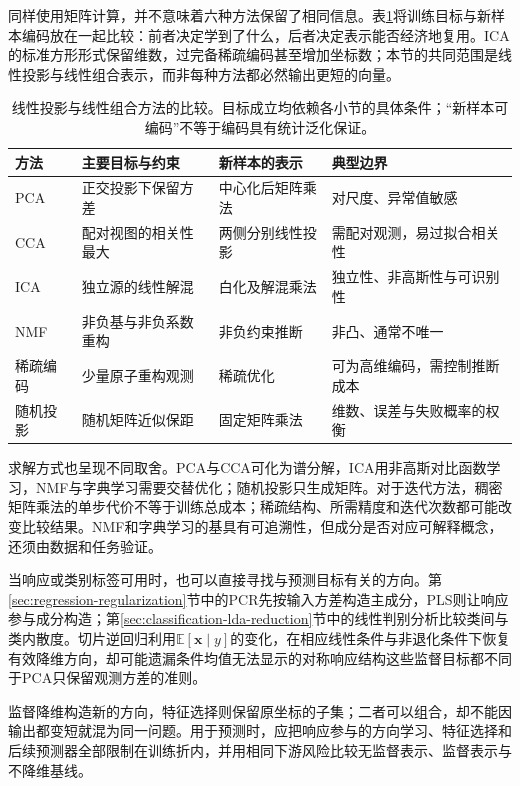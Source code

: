 同样使用矩阵计算，并不意味着六种方法保留了相同信息。表\ref{tab:dim-linear-comparison}将训练目标与新样本编码放在一起比较：前者决定学到了什么，后者决定表示能否经济地复用。ICA的标准方形形式保留维数，过完备稀疏编码甚至增加坐标数；本节的共同范围是线性投影与线性组合表示，而非每种方法都必然输出更短的向量。

\begin{table}[htbp]
  \centering
  \small
  \begin{tabularx}{\linewidth}{@{}lXXX@{}}
    \toprule
    方法 & 主要目标与约束 & 新样本的表示 & 典型边界\\
    \midrule
    PCA & 正交投影下保留方差 & 中心化后矩阵乘法 & 对尺度、异常值敏感\\
    CCA & 配对视图的相关性最大 & 两侧分别线性投影 & 需配对观测，易过拟合相关性\\
    ICA & 独立源的线性解混 & 白化及解混乘法 & 独立性、非高斯性与可识别性\\
    NMF & 非负基与非负系数重构 & 非负约束推断 & 非凸、通常不唯一\\
    稀疏编码 & 少量原子重构观测 & 稀疏优化 & 可为高维编码，需控制推断成本\\
    随机投影 & 随机矩阵近似保距 & 固定矩阵乘法 & 维数、误差与失败概率的权衡\\
    \bottomrule
  \end{tabularx}
  \caption{线性投影与线性组合方法的比较。目标成立均依赖各小节的具体条件；“新样本可编码”不等于编码具有统计泛化保证。}
  \label{tab:dim-linear-comparison}
\end{table}

求解方式也呈现不同取舍。PCA与CCA可化为谱分解，ICA用非高斯对比函数学习，NMF与字典学习需要交替优化；随机投影只生成矩阵。对于迭代方法，稠密矩阵乘法的单步代价不等于训练总成本；稀疏结构、所需精度和迭代次数都可能改变比较结果。NMF和字典学习的基具有可追溯性，但成分是否对应可解释概念，还须由数据和任务验证。

当响应或类别标签可用时，也可以直接寻找与预测目标有关的方向。第\ref{sec:regression-regularization}节中的PCR先按输入方差构造主成分，PLS则让响应参与成分构造；第\ref{sec:classification-lda-reduction}节中的线性判别分析比较类间与类内散度。切片逆回归利用$\mathbb{E}[\bm{x}\mid y]$的变化，在相应线性条件与非退化条件下恢复有效降维方向，却可能遗漏条件均值无法显示的对称响应结构这些监督目标都不同于PCA只保留观测方差的准则。

监督降维构造新的方向，特征选择则保留原坐标的子集；二者可以组合，却不能因输出都变短就混为同一问题。用于预测时，应把响应参与的方向学习、特征选择和后续预测器全部限制在训练折内，并用相同下游风险比较无监督表示、监督表示与不降维基线。

